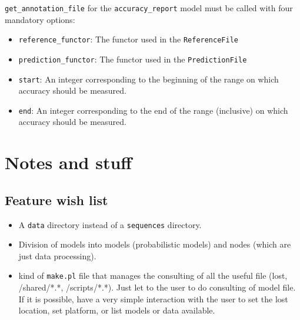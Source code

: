 \documentclass{book}
\begin{document}
\texttt{get\_annotation\_file} for the \texttt{accuracy\_report} model
must be called with four mandatory options:
\begin{itemize}
\item \texttt{reference\_functor}: The functor used in the \texttt{ReferenceFile}
\item \texttt{prediction\_functor}: The functor used in the
  \texttt{PredictionFile}
\item \texttt{start}: An integer corresponding to the beginning of the range on which accuracy
  should be measured.
\item \texttt{end}: An integer corresponding to the end of the range
  (inclusive) on which accuracy should be measured.
\end{itemize}


\chapter{Notes and stuff}

\section{Feature wish list}

\begin{itemize}
\item A \texttt{data} directory instead of a \texttt{sequences}
  directory.
\item Division of models into models (probabilistic models) and nodes
  (which are just data processing).
\item kind of \texttt{make.pl} file that manages the consulting of all the
useful file (lost, /shared/*.*, /scripts/*.*). Just let to the user
to do consulting of model file. If it is possible, have a very simple
interaction with the user to set the lost location, set platform, or list
models or data available.
\end{itemize}



\printindex
\end{document}

